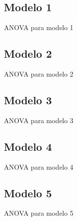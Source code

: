 \documentclass[11pt]{article}
\begin{document}
\subsection*{Modelo 1}

\begin{table}[H]
    \centering
    \caption{ANOVA para modelo 1}
    \label{3-mod1Anova}
\end{table}
\subsection*{Modelo 2}

\begin{table}[H]
    \centering
    \caption{ANOVA para modelo 2}
    \label{3-mod2Anova}
\end{table}
\subsection*{Modelo 3}

\begin{table}[H]
    \centering
    \caption{ANOVA para modelo 3}
    \label{3-mod3Anova}
\end{table}
\subsection*{Modelo 4}

\begin{table}[H]
    \centering
    \caption{ANOVA para modelo 4}
    \label{3-mod4Anova}
\end{table}
\subsection*{Modelo 5}

\begin{table}[H]
    \centering
    \caption{ANOVA para modelo 5}
    \label{3-mod5Anova}
\end{table}
\end{document}
